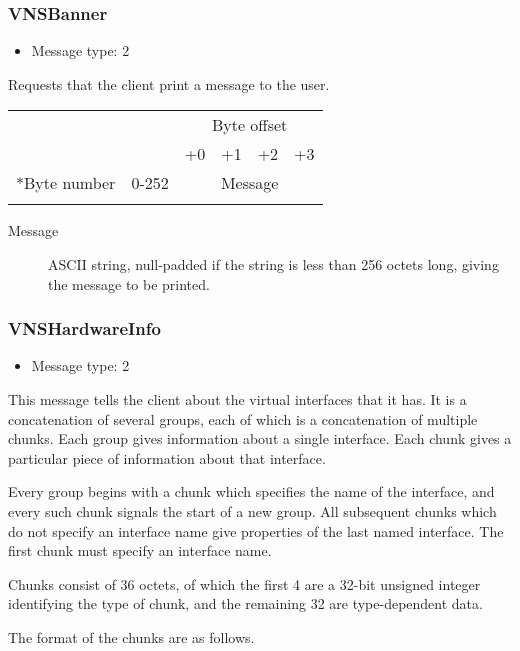 \documentclass[a4paper,12pt]{report}
\begin{document}
\subsubsection{VNSBanner}
\begin{itemize}
\item Message type: 2
\end{itemize}
Requests that the client print a message to the user.
\begin{center}
\begin{tabular}{r r | c | c | c | c |}
 & & \multicolumn{4}{c}{Byte offset} \\
 & & +0 & +1 & +2 & +3 \\
\hhline{~-----}
\multirow{1}*{Byte number} & 0-252 & \multicolumn{4}{c|}{Message} \\
\hhline{~~----}
\end{tabular}
\end{center}
\begin{description}
\item[Message] ASCII string, null-padded if the string is less than 256 octets long, giving the message to be printed.
\end{description}

\subsubsection{VNSHardwareInfo}
\begin{itemize}
\item Message type: 2
\end{itemize}
This message tells the client about the virtual interfaces that it has.  It is a concatenation of several groups, each of which is a concatenation of multiple chunks.  Each group gives information about a single interface.  Each chunk gives a particular piece of information about that interface.

Every group begins with a chunk which specifies the name of the interface, and every such chunk signals the start of a new group.  All subsequent chunks which do not specify an interface name give properties of the last named interface.  The first chunk must specify an interface name.

Chunks consist of 36 octets, of which the first 4 are a 32-bit unsigned integer identifying the type of chunk, and the remaining 32 are type-dependent data.

The format of the chunks are as follows.
\end{document}
